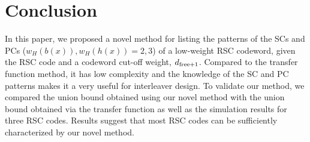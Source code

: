 \section{Conclusion}
\label{sec6}
In this paper, we proposed a novel method for  listing the patterns of the SCs and PCs ($w_H(b(x)),w_H(h(x)) = 2,3$) of a low-weight RSC codeword, given the RSC code and a codeword cut-off weight, $d_{\rm free+1}$.
Compared to the transfer function method, it has low complexity and the knowledge of the SC and PC patterns makes it a very useful for interleaver design. To validate our method, we compared the union bound obtained using our novel method with the union bound obtained via the transfer function as well as the simulation results for three RSC codes. Results suggest that most RSC codes can be sufficiently characterized by our novel method.
